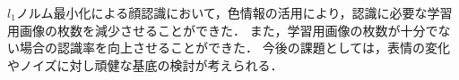 $l_1$ノルム最小化による顔認識において，色情報の活用により，認識に必要な学習用画像の枚数を減少させることができた．
また，学習用画像の枚数が十分でない場合の認識率を向上させることができた．
今後の課題としては，表情の変化やノイズに対し頑健な基底の検討が考えられる．
